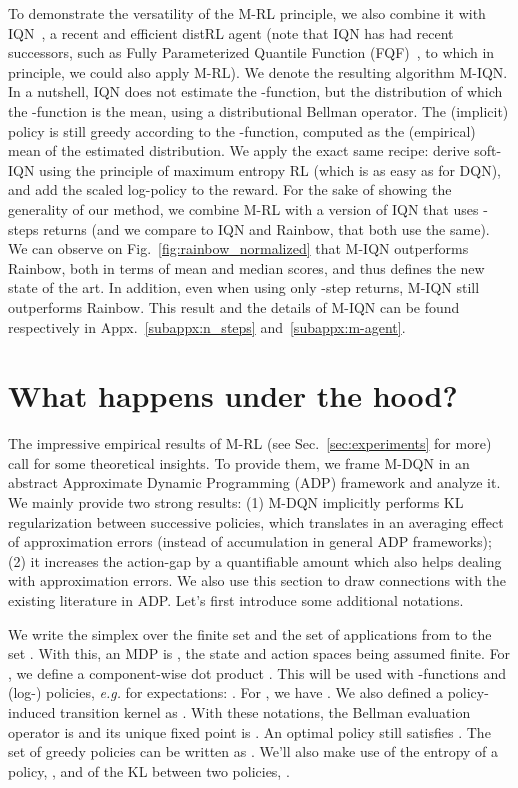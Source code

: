 \documentclass{article}
\begin{document}
To demonstrate the versatility of the M-RL principle, we also combine it with IQN~\cite{dabney2018implicit}, a recent and efficient distRL agent (note that IQN has had recent successors, such as Fully Parameterized Quantile Function (FQF)~\cite{yang2019fully}, to which in principle, we could also apply M-RL). We denote the resulting algorithm M-IQN. In a nutshell, IQN does not estimate the -function, but the distribution of which the -function is the mean, using a distributional Bellman operator. The (implicit) policy is still greedy according to the -function, computed as the (empirical) mean of the estimated distribution. We apply the exact same recipe: derive soft-IQN using the principle of maximum entropy RL (which is as easy as for DQN), and add the scaled log-policy to the reward. For the sake of showing the generality of our method, we combine M-RL with a version of IQN that uses -steps returns (and we compare to IQN and Rainbow, that both use the same). We can observe on Fig.~\ref{fig:rainbow_normalized} that M-IQN outperforms Rainbow, both in terms of mean and median scores, and thus defines the new state of the art. In addition, even when using only -step returns, M-IQN still outperforms Rainbow. This result and the details of M-IQN can be found respectively in Appx.~\ref{subappx:n_steps} and~\ref{subappx:m-agent}.



\section{What happens under the hood? \label{sec:what}}


The impressive empirical results of M-RL (see Sec.~\ref{sec:experiments} for more) call for some theoretical insights. To provide them, we frame M-DQN in an abstract Approximate Dynamic Programming (ADP) framework and analyze it.
We mainly provide two strong results: (1) M-DQN implicitly performs KL regularization between successive policies, which translates in an averaging effect of approximation errors (instead of accumulation in general ADP frameworks); (2) it increases the action-gap by a quantifiable amount which also helps dealing with approximation errors.
We also use this section to draw connections with the existing literature in ADP. Let's first introduce some additional notations.

We write  the simplex over the finite set  and  the set of applications from  to the set . With this, an MDP is , the state and action spaces being assumed finite. For , we define a component-wise dot product . This will be used with -functions and (log-) policies, \textit{e.g.} for expectations: .
For , we have . We also defined a policy-induced transition kernel  as . With these notations, the Bellman evaluation operator is  and its unique fixed point is . An optimal policy still satisfies . The set of greedy policies can be written as . We'll also make use of the entropy of a policy, , and of the KL between two policies, .
\end{document}

